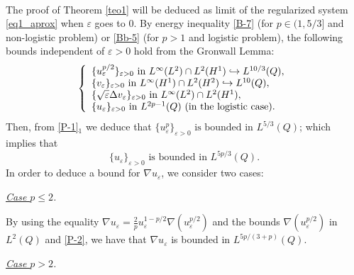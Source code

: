 \documentclass[11pt,reqno]{amsart}%
\numberwithin{equation}{section}
\begin{document}
{\

The proof of Theorem \ref{teo1}   will be deduced  as  limit of the regularized system  \eqref{eq1_aprox} when $\varepsilon$ goes to $0$. 
 By energy inequality \eqref{B-7} (for $p\in (1,5/3]$ and non-logistic problem) or \eqref{Bb-5} (for $p>1$ and logistic problem),   the following bounds independent of $\varepsilon>0$ hold from the Gronwall Lemma:
\begin{equation}\label{P-1}
\left\{
\begin{array}{l}
\{ u_\varepsilon^{p/2}\}_{\varepsilon>0} \hbox{ in } L^\infty(L^2)\cap L^2(H^1)\hookrightarrow L^{10/3}(Q),\\
\{ v_\varepsilon\}_{\varepsilon>0} \hbox{ in } L^\infty(H^1)\cap L^2(H^2)\hookrightarrow L^{10}(Q),\\
\{ \sqrt\varepsilon\Delta v_\varepsilon \}_{\varepsilon>0} \hbox{ in } L^\infty(L^2)\cap L^2(H^1),\\
\{ u_\varepsilon\}_{\varepsilon>0} \hbox{ in } L^{2p-1}(Q)\ \mbox{(in the logistic case)}.
\end{array}
\right.
\end{equation}
Then, from \eqref{P-1}$_1$ we deduce that $\{u_\varepsilon^p\}_{\varepsilon>0}\mbox{ is bounded in }L^{5/3}(Q)$; which implies that 
\begin{equation}\label{P-2}
\{u_\varepsilon\}_{\varepsilon>0}\mbox{ is bounded in }L^{5p/3}(Q).
\end{equation}
In order to deduce a bound for $\nabla u_\varepsilon$, we consider two cases:


{\it \underline{Case $p\le 2$}.} 

By using the equality $\nabla u_\varepsilon=\frac2p u_\varepsilon^{1-p/2}\nabla(u_\varepsilon^{p/2})$ and the 
bounds $\nabla(u_\varepsilon^{p/2})$ in $L^2(Q)$ and \eqref{P-2},
  we have that $\nabla u_\varepsilon$ is bounded in $L^{5p/(3+p)}(Q)$.
  

{\it \underline{Case $p> 2$}.} 

}
\end{document}
